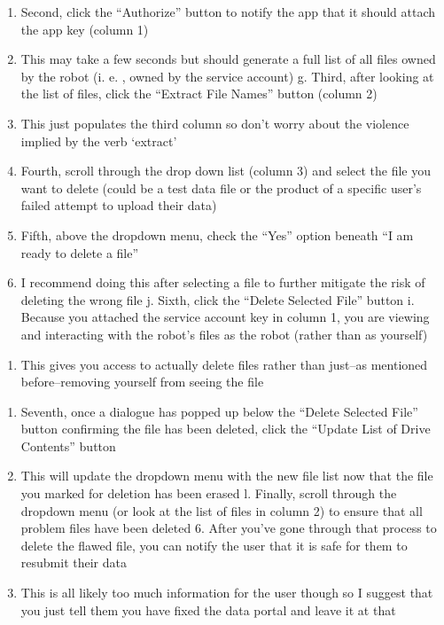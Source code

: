 \documentclass[
  letterpaper,
  DIV=11,
  numbers=noendperiod]{scrreprt}
\providecommand{\tightlist}{%
  \setlength{\itemsep}{0pt}\setlength{\parskip}{0pt}}\usepackage{longtable,booktabs,array}
\begin{document}
\begin{enumerate}
\def\labelenumi{\alph{enumi}.}
\setcounter{enumi}{5}
\item
  Second, click the ``Authorize'' button to notify the app that it
  should attach the app key (column 1)
\item
  This may take a few seconds but should generate a full list of all
  files owned by the robot (i. e. , owned by the service account) g.
  Third, after looking at the list of files, click the ``Extract File
  Names'' button (column 2)
\item
  This just populates the third column so don't worry about the violence
  implied by the verb `extract'
\item
  Fourth, scroll through the drop down list (column 3) and select the
  file you want to delete (could be a test data file or the product of a
  specific user's failed attempt to upload their data)
\item
  Fifth, above the dropdown menu, check the ``Yes'' option beneath ``I
  am ready to delete a file''
\item
  I recommend doing this after selecting a file to further mitigate the
  risk of deleting the wrong file j. Sixth, click the ``Delete Selected
  File'' button i. Because you attached the service account key in
  column 1, you are viewing and interacting with the robot's files as
  the robot (rather than as yourself)
\end{enumerate}

\begin{enumerate}
\def\labelenumi{\roman{enumi}.}
\setcounter{enumi}{1}
\tightlist
\item
  This gives you access to actually delete files rather than just--as
  mentioned before--removing yourself from seeing the file
\end{enumerate}

\begin{enumerate}
\def\labelenumi{\alph{enumi}.}
\setcounter{enumi}{10}
\item
  Seventh, once a dialogue has popped up below the ``Delete Selected
  File'' button confirming the file has been deleted, click the ``Update
  List of Drive Contents'' button
\item
  This will update the dropdown menu with the new file list now that the
  file you marked for deletion has been erased l. Finally, scroll
  through the dropdown menu (or look at the list of files in column 2)
  to ensure that all problem files have been deleted 6. After you've
  gone through that process to delete the flawed file, you can notify
  the user that it is safe for them to resubmit their data
\item
  This is all likely too much information for the user though so I
  suggest that you just tell them you have fixed the data portal and
  leave it at that
\end{enumerate}
\end{document}
